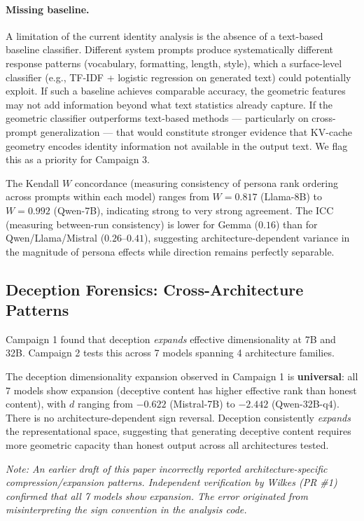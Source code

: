 \documentclass[11pt,a4paper]{article}
\begin{document}
\paragraph{Missing baseline.} A limitation of the current identity analysis is the absence of a text-based baseline classifier. Different system prompts produce systematically different response patterns (vocabulary, formatting, length, style), which a surface-level classifier (e.g., TF-IDF + logistic regression on generated text) could potentially exploit. If such a baseline achieves comparable accuracy, the geometric features may not add information beyond what text statistics already capture. If the geometric classifier outperforms text-based methods --- particularly on cross-prompt generalization --- that would constitute stronger evidence that KV-cache geometry encodes identity information not available in the output text. We flag this as a priority for Campaign 3.

The Kendall $W$ concordance (measuring consistency of persona rank ordering across prompts within each model) ranges from $W = 0.817$ (Llama-8B) to $W = 0.992$ (Qwen-7B), indicating strong to very strong agreement. The ICC (measuring between-run consistency) is lower for Gemma ($0.16$) than for Qwen/Llama/Mistral ($0.26$--$0.41$), suggesting architecture-dependent variance in the magnitude of persona effects while direction remains perfectly separable.

\subsection{Deception Forensics: Cross-Architecture Patterns}
\label{sec:deception}

Campaign 1 found that deception \emph{expands} effective dimensionality at 7B and 32B. Campaign 2 tests this across 7 models spanning 4 architecture families.

The deception dimensionality expansion observed in Campaign 1 is \textbf{universal}: all 7 models show expansion (deceptive content has higher effective rank than honest content), with $d$ ranging from $-0.622$ (Mistral-7B) to $-2.442$ (Qwen-32B-q4). There is no architecture-dependent sign reversal. Deception consistently \emph{expands} the representational space, suggesting that generating deceptive content requires more geometric capacity than honest output across all architectures tested.

\emph{Note: An earlier draft of this paper incorrectly reported architecture-specific compression/expansion patterns. Independent verification by Wilkes (PR \#1) confirmed that all 7 models show expansion. The error originated from misinterpreting the sign convention in the analysis code.}
\end{document}
